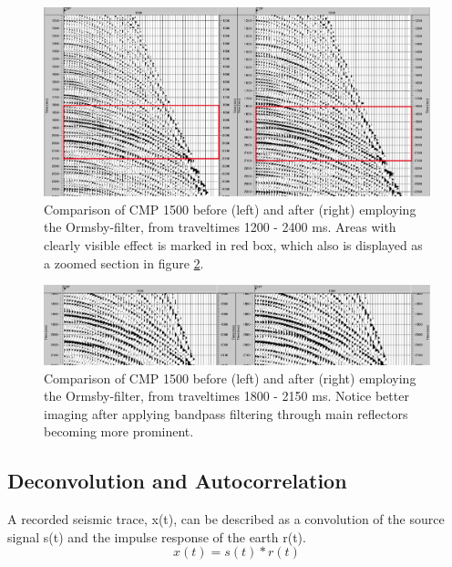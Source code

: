 \documentclass[10pt,a4paper]{article}
\begin{document}
\begin{figure}[H]
\includegraphics[width=\textwidth]{fig13.jpg}
\caption{Comparison of CMP 1500 before (left) and after (right) employing the Ormsby-filter, from traveltimes 1200 - 2400 ms. Areas with clearly visible effect is marked in red box, which also is displayed as a zoomed section in figure \ref{fig14}.}
\label{fig13}
\end{figure}

\begin{figure}[H]
\includegraphics[width=\textwidth]{fig14.jpg}
\caption{Comparison of CMP 1500 before (left) and after (right) employing the Ormsby-filter, from traveltimes 1800 - 2150 ms. Notice better imaging after applying bandpass filtering through main reflectors becoming more prominent.}
\label{fig14}
\end{figure}

\subsection{Deconvolution and Autocorrelation}

A recorded seismic trace, x(t), can be described as a convolution of the source signal s(t) and the impulse response of the earth r(t).
$$
x(t) = s(t)*r(t)
$$
\end{document}
